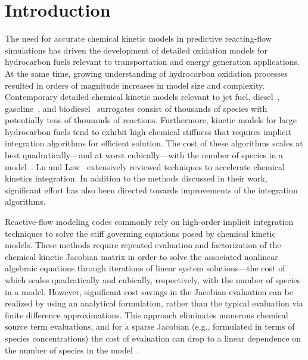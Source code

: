 \documentclass[preprint]{elsarticle}
\begin{document}
\clearpage

\section{Introduction}
\label{sec:Intro}

The need for accurate chemical kinetic models in predictive reacting-flow simulations has driven the development of detailed oxidation models for hydrocarbon fuels relevant to transportation and energy generation applications.
At the same time, growing understanding of hydrocarbon oxidation processes resulted in orders of magnitude increases in model size and complexity.
Contemporary detailed chemical kinetic models relevant to jet fuel, diesel~\cite{Sarathy:2011kx}, gasoline~\cite{Mehl:2011jn}, and biodiesel~\cite{Herbinet:2010gu} surrogates consist of thousands of species with potentially tens of thousands of reactions.
Furthermore, kinetic models for large hydrocarbon fuels tend to exhibit high chemical stiffness that requires implicit integration algorithms for efficient solution.
The cost of these algorithms scales at best quadratically---and at worst cubically---with the number of species in a model~\cite{Lu:2009gh}.
Lu and Law~\cite{Lu:2009gh} extensively reviewed techniques to accelerate chemical kinetics integration.
In addition to the methods discussed in their work, significant effort has also been directed towards improvements of the integration algorithms.

Reactive-flow modeling codes commonly rely on high-order implicit integration techniques to solve the stiff governing equations posed by chemical kinetic models.
These methods require repeated evaluation and factorization of the chemical kinetic Jacobian matrix in order to solve the associated nonlinear algebraic equations through iterations of linear system solutions---the cost of which scales quadratically and cubically, respectively, with the number of species in a model.
However, significant cost savings in the Jacobian evaluation can be realized by using an analytical formulation, rather than the typical evaluation via finite difference approximations.
This approach eliminates numerous chemical source term evaluations, and for a sparse Jacobian (e.g., formulated in terms of species concentrations) the cost of evaluation can drop to a linear dependence on the number of species in the model~\cite{Lu:2009gh}.
\end{document}
